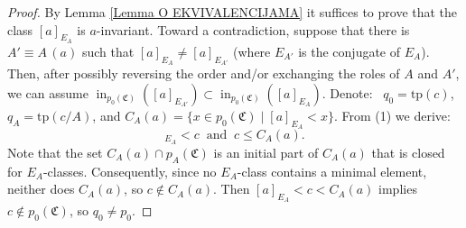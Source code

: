 \documentclass{amsart}
\theoremstyle{definition}
\theoremstyle{definition}
\def\strok{\restriction}
\newcommand{\Mon}{\mathfrak C}
\newcommand{\tp}{\mathrm{tp}}
\DeclareMathOperator{\supin}{in}
\begin{document}
\begin{proof}
By Lemma \ref{Lemma O EKVIVALENCIJAMA} it suffices to prove that the class $[a]_{E_A}$ is $a$-invariant. Toward a contradiction, suppose that there is $A'\equiv A\,(a)$ such that $[a]_{E_A}\neq [a]_{E_{A'}}$ (where $E_{A'}$ is the conjugate of $E_A$). Then, after possibly reversing the order and/or exchanging the roles of $A$ and $A'$, we can assume $\supin_{p_0(\Mon)} ([a]_{E_{A'}})\subset\supin_{p_0(\Mon)} ([a]_{E_A})$. 
%
%
%
Denote: \ $q_0=\tp(c)$, $q_A=\tp(c/A)$,  and $C_A(a)=\{x\in p_0(\Mon)\mid [a]_{E_A}<x\}$.  From (1) we derive:
\begin{equation}
[a]_{E_A}<c \ \text{ and } \  c\leqslant C_A(a).
\end{equation}
Note that the set $C_A(a)\cap p_A(\Mon)$ is an initial part of $C_A(a)$ that is closed for $E_A$-classes. Consequently, since no $E_A$-class contains a minimal element, neither does $C_A(a)$, so $c\notin C_A(a)$. Then $[a]_{E_A}<c<C_A(a)$ implies $c\notin p_0(\Mon)$, so $q_0\neq p_0$.


\end{proof}
\end{document}
